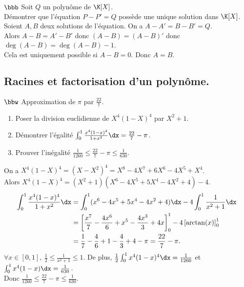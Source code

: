 \documentclass[11pt]{article}
\begin{document}
\begin{exercice}{$\bbb$}{}
    Soit $Q$ un polynôme de $\K[X]$.\\
    Démontrer que l'équation $P-P'=Q$ possède une unique solution dans $\K[X]$.
    \tcblower
    Soient $A,B$ deux solutions de l'équation. On a $A-A'=B-B'=Q$.\\
    Alors $A-B=A'-B'$ donc $(A-B)=(A-B)'$ donc $\deg(A-B)=\deg(A-B)-1$.\\
    Cela est uniquement possible si $A-B=0$. Donc $A=B$.
\end{exercice}

\subsection*{Racines et factorisation d'un polynôme.}

\begin{exercice}{$\bbw$ Approximation de $\pi$ par $\frac{22}{7}$.}{}
    \begin{enumerate}
        \item Poser la division euclidienne de $X^4(1-X)^4$ par $X^2+1$.
        \item Démontrer l'égalité $\int_0^1\frac{x^4(1-x)^4}{1+x^2}\dx=\frac{22}{7}-\pi$.
        \item Prouver l'inégalité $\frac{1}{1260}\leq\frac{22}{7}-\pi\leq\frac{1}{630}$.
    \end{enumerate}
    \tcblower
     On a $X^4(1-X)^4=(X-X^2)^4=X^8-4X^7+6X^6-4X^5+X^4$.\\
    Alors $X^4(1-X)^4=(X^2+1)(X^6-4X^5+5X^4-4X^2+4)-4$.\\
    \begin{align*}
        \int_0^1\frac{x^4(1-x)^4}{1+x^2}\dx&=\int_0^1(x^6-4x^5+5x^4-4x^2+4)\dx-4\int_0^1\frac{1}{x^2+1}\dx\\
        &=\left[ \frac{x^7}{7} - \frac{4x^6}{6} + x^5 - \frac{4x^3}{3} + 4x \right]_0^1 - 4\left[ \arctan(x) \right]_0^1\\
        &=\frac{1}{7}-\frac{4}{6}+1-\frac{4}{3}+4-\pi = \frac{22}{7}-\pi.
    \end{align*}
     $\forall x \in [0,1], ~ \frac{1}{2}\leq\frac{1}{x^2+1}\leq1$. De plus, $\frac{1}{2}\int_0^1x^4(1-x)^4\dx=\frac{1}{1260}$ et $\int_0^1x^4(1-x)\dx=\frac{1}{630}$.\\
    Donc $\frac{1}{1260}\leq\frac{22}{7}-\pi\leq\frac{1}{630}$.
\end{exercice}
\end{document}
